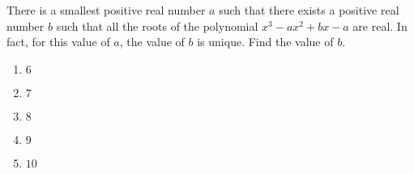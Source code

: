 There is a smallest positive real number $a$ such that there exists a positive real number $b$ such that all the roots of the polynomial $x^{3}-ax^{2}+bx-a$ are real. In fact, for this value of $a$, the value of $b$ is unique. Find the value of $b$.

\begin{enumerate}
\item $6$
\item $7$
\item $8$
\item $9$
\item $10$
\end{enumerate}

